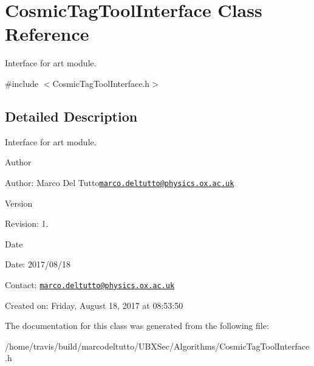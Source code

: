 \hypertarget{classCosmicTagToolInterface}{\section{Cosmic\-Tag\-Tool\-Interface Class Reference}
\label{classCosmicTagToolInterface}
}


Interface for art module.  




{\ttfamily \#include $<$Cosmic\-Tag\-Tool\-Interface.\-h$>$}



\subsection{Detailed Description}
Interface for art module. 

\begin{DoxyAuthor}{Author}

\end{DoxyAuthor}
\begin{DoxyParagraph}{Author\-:}
Marco Del Tutto\href{mailto:marco.deltutto@physics.ox.ac.uk}{\tt marco.\-deltutto@physics.\-ox.\-ac.\-uk} 
\end{DoxyParagraph}


\begin{DoxyVersion}{Version}

\end{DoxyVersion}
\begin{DoxyParagraph}{Revision\-:}
1. 
\end{DoxyParagraph}


\begin{DoxyDate}{Date}

\end{DoxyDate}
\begin{DoxyParagraph}{Date\-:}
2017/08/18 
\end{DoxyParagraph}


Contact\-: \href{mailto:marco.deltutto@physics.ox.ac.uk}{\tt marco.\-deltutto@physics.\-ox.\-ac.\-uk}

Created on\-: Friday, August 18, 2017 at 08\-:53\-:50 

The documentation for this class was generated from the following file\-:\begin{DoxyCompactItemize}
\item 
/home/travis/build/marcodeltutto/\-U\-B\-X\-Sec/\-Algorithms/Cosmic\-Tag\-Tool\-Interface.\-h\end{DoxyCompactItemize}
